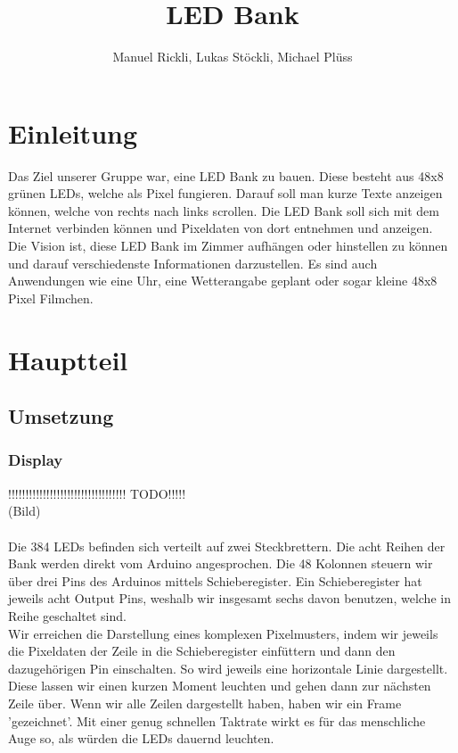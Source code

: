 \documentclass[10pt,a4paper]{article}
\author{Manuel Rickli, Lukas Stöckli, Michael Plüss}
\title{LED Bank}
\begin{document}
\maketitle

\section{Einleitung}

Das Ziel unserer Gruppe war, eine LED Bank zu bauen. Diese besteht aus 48x8 grünen LEDs, welche als Pixel fungieren. Darauf soll man kurze Texte anzeigen können, welche von rechts nach links scrollen. Die LED Bank soll sich mit dem Internet verbinden können und Pixeldaten von dort entnehmen und anzeigen.\\
Die Vision ist, diese LED Bank im Zimmer aufhängen oder hinstellen zu können und darauf verschiedenste Informationen darzustellen. Es sind auch Anwendungen wie eine Uhr, eine Wetterangabe geplant oder sogar kleine 48x8 Pixel Filmchen.\\

\section{Hauptteil}

\subsection{Umsetzung}

\subsubsection{Display}

!!!!!!!!!!!!!!!!!!!!!!!!!!!!!!!!!! TODO!!!!!\\
(Bild)\\\\

Die 384 LEDs befinden sich verteilt auf zwei Steckbrettern. Die acht Reihen der Bank werden direkt vom Arduino angesprochen. Die 48 Kolonnen steuern wir über drei Pins des Arduinos mittels Schieberegister. Ein Schieberegister hat jeweils acht Output Pins, weshalb wir insgesamt sechs davon benutzen, welche in Reihe geschaltet sind.\\
Wir erreichen die Darstellung eines komplexen Pixelmusters, indem wir jeweils die Pixeldaten der Zeile in die Schieberegister einfüttern und dann den dazugehörigen Pin einschalten. So wird jeweils eine horizontale Linie dargestellt. Diese lassen wir einen kurzen Moment leuchten und gehen dann zur nächsten Zeile über. Wenn wir alle Zeilen dargestellt haben, haben wir ein Frame 'gezeichnet'. Mit einer genug schnellen Taktrate wirkt es für das menschliche Auge so, als würden die LEDs dauernd leuchten.\\
\end{document}
